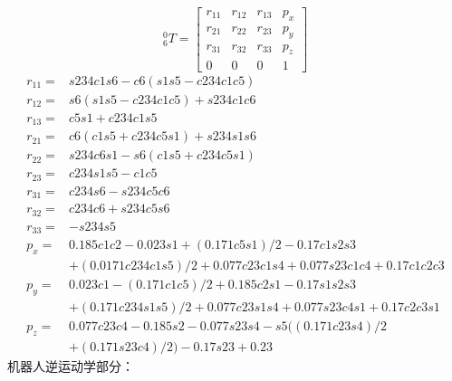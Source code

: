 \documentclass[12pt]{article}
\begin{document}
\[
    ^0_6T= \left[
        \begin{matrix}
            r_{11} & r_{12} & r_{13} & p_x \\
            r_{21} & r_{22} & r_{23} & p_y \\
            r_{31} & r_{32} & r_{33} & p_z \\
            0      & 0      & 0      & 1
        \end{matrix}  \right]
\]
\[
    \begin{aligned}
        r_{11}=&s234c1s6 - c6(s1s5 - c234c1c5)\\
        r_{12}=&s6(s1s5 - c234c1c5) + s234c1c6\\
        r_{13}=& c5s1 + c234c1s5\\ 
        r_{21}=&c6(c1s5 + c234c5s1) + s234s1s6\\
        r_{22}=&s234c6s1 - s6(c1s5 + c234c5s1)\\
        r_{23}=&c234s1s5 - c1c5\\
        r_{31}=&c234s6 - s234c5c6\\
        r_{32}=&c234c6 + s234c5s6\\
        r_{33}=&-s234s5\\
        p_x=&0.185c1c2 - 0.023s1 + (0.171c5s1)/2 - 0.17c1s2s3  \\
        &+(0.0171c234c1s5)/2 + 0.077c23c1s4 + 0.077s23c1c4 + 0.17c1c2c3\\
        p_y=&0.023c1 - (0.171c1c5)/2 + 0.185c2s1 - 0.17s1s2s3  \\
        &+(0.171c234s1s5)/2 + 0.077c23s1s4 + 0.077s23c4s1 + 0.17c2c3s1\\
        p_z=&0.077c23c4 - 0.185s2 - 0.077s23s4 - s5((0.171c23s4)/2  \\
        &+(0.171s23c4)/2) - 0.17s23 + 0.23
    \end{aligned}
\]
机器人逆运动学部分：
\end{document}
